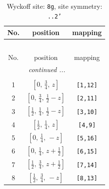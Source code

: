 \documentclass[fleqn,8pt]{jsarticle}
\begin{document}
\begin{longtable}{ccc}
\caption{Wyckoff site: {\tt 8g}, site symmetry: {\tt ..2'}}
 \\
 \hline \hline
No. & position & mapping \\ \hline \endfirsthead

\multicolumn{2}{l}{\tablename\ \thetable{}} \\
 \hline \hline
No. & position & mapping \\ \hline \endhead

 \hline \hline
\multicolumn{2}{r}{\footnotesize\it continued ...} \\ \endfoot

 \hline \hline
\multicolumn{2}{r}{} \\ \endlastfoot

1 & $\left[ 0,\, \frac{3}{4},\, z \right]$ & {\tt [1,12]} \\ \hline
2 & $\left[ 0,\, \frac{3}{4},\, \frac{1}{2} - z \right]$ & {\tt [2,11]} \\ \hline
3 & $\left[ \frac{1}{2},\, \frac{1}{4},\, \frac{1}{2} - z \right]$ & {\tt [3,10]} \\ \hline
4 & $\left[ \frac{1}{2},\, \frac{1}{4},\, z \right]$ & {\tt [4,9]} \\ \hline
5 & $\left[ 0,\, \frac{1}{4},\, - z \right]$ & {\tt [5,16]} \\ \hline
6 & $\left[ 0,\, \frac{1}{4},\, z + \frac{1}{2} \right]$ & {\tt [6,15]} \\ \hline
7 & $\left[ \frac{1}{2},\, \frac{3}{4},\, z + \frac{1}{2} \right]$ & {\tt [7,14]} \\ \hline
8 & $\left[ \frac{1}{2},\, \frac{3}{4},\, - z \right]$ & {\tt [8,13]} \\
\end{longtable}
\renewcommand{\arraystretch}{1.2}
\end{document}
